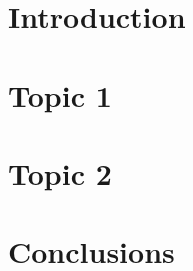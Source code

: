 \documentclass[12pt]{article}
\begin{document}
\maketitle

\section{Introduction}

\section{Topic 1}

\section{Topic 2}

\section{Conclusions}
\end{document}
